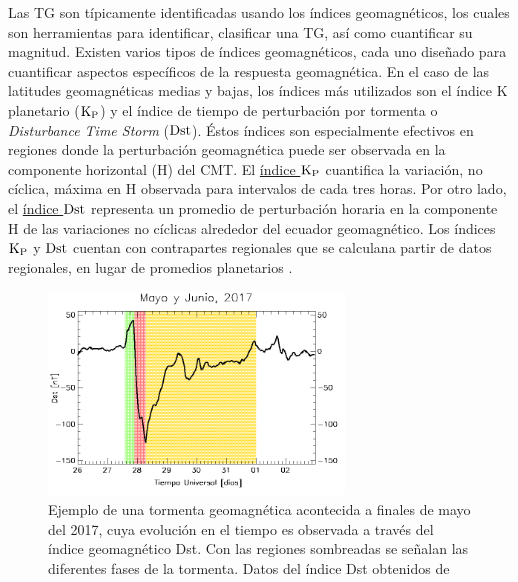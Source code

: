 Las TG son típicamente identificadas usando los índices geomagnéticos, los cuales son herramientas para identificar, clasificar una TG, así como cuantificar su magnitud. Existen varios tipos de índices geomagnéticos, cada uno diseñado para cuantificar aspectos específicos de la respuesta geomagnética. En el caso de las latitudes geomagnéticas medias y bajas, los índices más utilizados son el índice K planetario (${\rm K_P}$) y el índice de tiempo de perturbación por tormenta o \emph{Disturbance Time Storm} (${\rm Dst}$). Éstos índices son especialmente efectivos en regiones donde la perturbación geomagnética puede ser observada en la componente horizontal (H) del CMT. El  \href{https://www.gfz-potsdam.de/en/section/geomagnetism/data-products-services/geomagnetic-kp-index}{índice ${\rm K_P}$} cuantifica la variación, no cíclica, máxima en H observada para intervalos de cada tres horas. Por otro lado, el \href{https://wdc.kugi.kyoto-u.ac.jp/dstae/index.html}{índice ${\rm Dst}$} representa un promedio de perturbación horaria en la componente H de las variaciones no cíclicas alrededor del ecuador geomagnético. Los índices ${\rm K_P}$ y ${\rm Dst}$ cuentan con contrapartes regionales que se calculana partir de datos regionales, en lugar de promedios planetarios \cite{mayaud1980}. 
\vspace{ 1 em}


\begin{figure}[h!]
	\begin{center}
 		\includegraphics[width = 0.7\textwidth]{Images/dst_ex2017-05-26.png}
 	\end{center}
 	\caption{\label{tgm_ex} Ejemplo de una tormenta geomagnética acontecida a finales de mayo del 2017, cuya evolución en el tiempo es observada a través del índice geomagnético Dst. Con las regiones sombreadas se señalan las diferentes fases de la tormenta. Datos del índice Dst obtenidos de \cite{idx}} 
\end{figure}

